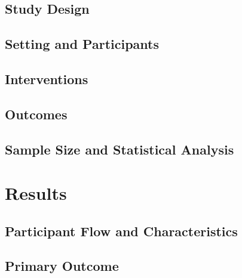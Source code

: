 \documentclass[9pt,a4paper,twocolumn,twoside]{rho-class/rho}
\begin{document}
	\subsection{Study Design}

	\subsection{Setting and Participants}

	\subsection{Interventions}

	\subsection{Outcomes}

	\subsection{Sample Size and Statistical Analysis}


	\section{Results}

	\subsection{Participant Flow and Characteristics}

	\subsection{Primary Outcome}
\end{document}
